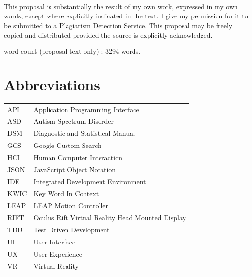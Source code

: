 \documentclass[a4paper, 11pt]{article}
\begin{document}
\begin{verbatim}














\end{verbatim}
\begin{justify}
This proposal is substantially the result of my own work, expressed in my own words, except where explicitly indicated in the text. I give my permission for it to be submitted to a Plagiarism Detection Service. This proposal may be freely copied and distributed provided the source is explicitly acknowledged.

\begin{center}
word count (proposal text only) : 3294 words.
\end{center}

\clearpage
\tableofcontents
\clearpage

\section*{Abbreviations}
\begin{tabular}{l l }
API & Application Programming Interface\\
ASD & Autism Spectrum Disorder\\
DSM & Diagnostic and Statistical Manual\\
GCS & Google Custom Search\\
HCI & Human Computer Interaction\\
JSON & JavaScript Object Notation\\
IDE & Integrated Development Environment\\
KWIC & Key Word In Context\\
LEAP & LEAP Motion Controller\\
RIFT & Oculus Rift Virtual Reality Head Mounted Display\\
TDD & Test Driven Development\\
UI & User Interface\\
UX & User Experience\\
VR & Virtual Reality\\
\end{tabular}


\end{justify}
\end{document}
